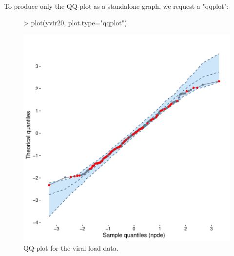 \documentclass{article}
\begin{document}
To produce only the QQ-plot as a standalone graph, we request a "qqplot":
\begin{figure}[!h]
\begin{center}
\begin{Schunk}
\begin{Sinput}
> plot(yvir20, plot.type="qqplot")
\end{Sinput}
\end{Schunk}
\includegraphics{demoGraphs-qqplotVL20}
\end{center}
\par \kern -0.5cm
\caption{QQ-plot for the viral load data.} \label{fig:qqplotVL20}
\end{figure}
\end{document}
